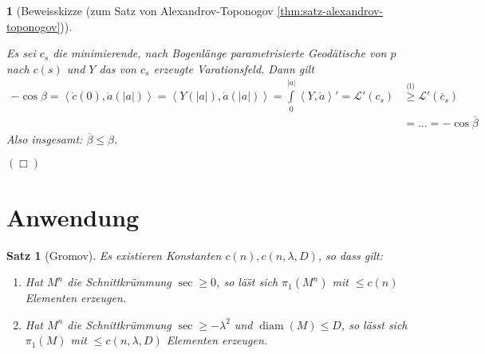 \documentclass[paper=A4, twoside, chapterprefix=true, bibliography=totoc, headsepline]{scrbook}
\DeclareMathOperator{\diam}{diam}   %
\theoremstyle{plain}
\newtheorem{Satz}[Dfn]{Satz}
\theoremstyle{nonumberplain}
\theoremstyle{empty}
\newtheorem{emptythm}{}%
\theoremstyle{break}
\begin{document}
\begin{emptythm}[Beweisskizze (zum Satz von Alexandrov-Toponogov \ref{thm:satz-alexandrov-toponogov})]
\begin{enumerate}[label=(\roman*),leftmargin=*,widest=ii]
\begin{center}
\end{center}
	Es sei $c_s$ die minimierende, nach Bogenl\"ange parametrisierte Geod\"atische von $p$ nach $c(s)$ und $Y$ das von $c_s$ erzeugte Varationsfeld.
	Dann gilt
	\begin{align*}
		- \cos \beta  = \left<\dot c(0), \dot a(|a|)\right> 
		= \left<Y(|a|), \dot a(|a|) \right>
		= \int\limits_0^{|a|} \left<Y, \dot a\right>'
		= \mathcal L'(c_s)
		&\overset{\text{(i)}}{\geq} \mathcal L'(\overline c_s)\\
		& = \ldots = -\cos \overline \beta
	\end{align*}
	Also insgesamt: $\overline \beta \leq \beta$.
\end{enumerate}
\hfill\ensuremath{(\Box)}
\end{emptythm}


\section{Anwendung}

\begin{Satz}[Gromov]
  Es existieren Konstanten $c(n), c(n,\lambda,D)$, so dass gilt:
  \begin{enumerate}[label=(\roman*)]
  \item Hat $M^n$ die Schnittkr\"ummung $\sec \geq 0$, so l\"a\"st sich $\pi_1(M^n)$ mit $\leq c(n)$ Elementen erzeugen.
  \item Hat $M^n$ die Schnittkr\"ummung $\sec \geq - \lambda^2$ und $\diam(M) \leq D$, so l\"asst sich $\pi_1(M)$ mit $\leq c(n,\lambda,D)$ Elementen erzeugen.
  \end{enumerate}
\end{Satz}
\end{document}
